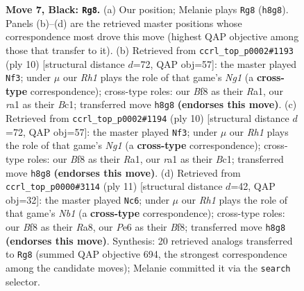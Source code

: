 \documentclass[11pt]{article}
\begin{document}
\begin{figure}[p]
\caption{\textbf{Move 7, Black: \texttt{Rg8}.} (a) Our position; Melanie plays \texttt{Rg8} (\texttt{h8g8}). Panels (b)--(d) are the retrieved master positions whose correspondence most drove this move (highest QAP objective among those that transfer to it). (b) Retrieved from \texttt{ccrl\_top\_p0002\#1193} (ply 10) [structural distance $d$=72, QAP obj=57]: the master played \texttt{Nf3}; under $\mu$ our \emph{Rh1} plays the role of that game's \emph{Ng1} (a \textbf{cross-type} correspondence); cross-type roles: our \emph{B}f8 as their \emph{R}a1, our \emph{r}a1 as their \emph{B}c1; transferred move \texttt{h8g8} \textbf{(endorses this move)}. (c) Retrieved from \texttt{ccrl\_top\_p0002\#1194} (ply 10) [structural distance $d$=72, QAP obj=57]: the master played \texttt{Nf3}; under $\mu$ our \emph{Rh1} plays the role of that game's \emph{Ng1} (a \textbf{cross-type} correspondence); cross-type roles: our \emph{B}f8 as their \emph{R}a1, our \emph{r}a1 as their \emph{B}c1; transferred move \texttt{h8g8} \textbf{(endorses this move)}. (d) Retrieved from \texttt{ccrl\_top\_p0000\#3114} (ply 11) [structural distance $d$=42, QAP obj=32]: the master played \texttt{Nc6}; under $\mu$ our \emph{Rh1} plays the role of that game's \emph{Nb1} (a \textbf{cross-type} correspondence); cross-type roles: our \emph{B}f8 as their \emph{R}a8, our \emph{P}e6 as their \emph{B}f8; transferred move \texttt{h8g8} \textbf{(endorses this move)}. Synthesis: 20 retrieved analogs transferred to \texttt{Rg8} (summed QAP objective 694, the strongest correspondence among the candidate moves); Melanie committed it via the \texttt{search} selector.}
\label{fig:thought-m13}
\end{figure}

\clearpage
\end{document}
